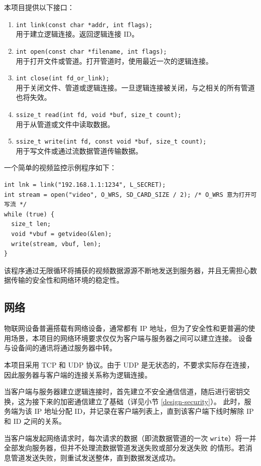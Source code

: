\documentclass{ctexart}
\begin{document}
本项目提供以下接口：
\begin{enumerate}
	\item \verb|int link(const char *addr, int flags);|\\
	用于建立逻辑连接。返回逻辑连接 ID。
	\item \verb|int open(const char *filename, int flags);|\\
	用于打开文件或管道。打开管道时，使用最近一次的逻辑连接。
	\item \verb|int close(int fd_or_link);|\\
	用于关闭文件、管道或逻辑连接。一旦逻辑连接被关闭，与之相关的所有管道也将失效。
	\item \verb|ssize_t read(int fd, void *buf, size_t count);|\\
	用于从管道或文件中读取数据。
	\item \verb|ssize_t write(int fd, const void *buf, size_t count);|\\
	用于写文件或通过流数据管道传输数据。
\end{enumerate}

一个简单的视频监控示例程序如下：
\begin{verbatim}
int lnk = link("192.168.1.1:1234", L_SECRET);
int stream = open("video", O_WRS, SD_CARD_SIZE / 2); /* O_WRS 意为打开可写流 */
while (true) {
  size_t len;
  void *vbuf = getvideo(&len);
  write(stream, vbuf, len);
}
\end{verbatim}
该程序通过无限循环将捕获的视频数据源源不断地发送到服务器，并且无需担心数据传输的安全性和网络环境的稳定性。

\subsection{网络}
\label{design-network}
物联网设备普遍搭载有网络设备，通常都有 IP 地址，但为了安全性和更普遍的使用场景，本项目的网络环境要求仅仅为客户端与服务器之间可以建立连接。
设备与设备间的通讯将通过服务器中转。

本项目采用 TCP 和 UDP 协议。由于 UDP 是无状态的，不要求实际存在连接，因此服务器与客户端的连接关系称为逻辑连接。

当客户端与服务器建立逻辑连接时，首先建立不安全通信信道，随后进行密钥交换，这为接下来的加密通信建立了基础（详见小节 \ref{design-security}）。
此时，服务端为该 IP 地址分配 ID，并记录在客户端列表上，直到该客户端下线时解除 IP 和 ID 之间的关系。

当客户端发起网络请求时，每次请求的数据（即流数据管道的一次 \verb|write|）将一并全部发向服务器，但并不处理流数据管道发送失败或部分发送失败
的情形。若消息管道发送失败，则重试发送整体，直到数据发送成功。
\end{document}
